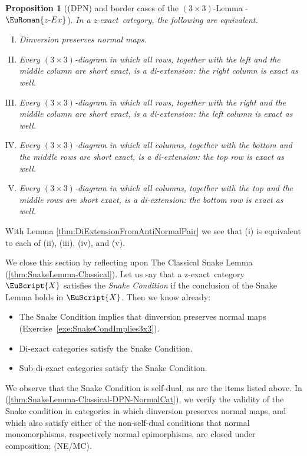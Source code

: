 \documentclass [12pt,oneside]{book}%
\makeatletter
\theoremstyle{captionstyle}  %
\newtheorem{proposition}[theorem]{Proposition}
\renewenvironment{proof}[1][\proofname]{\vspace{-2ex}\par       %
	\pushQED{\qed}%
	\normalfont \topsep6\p@\@plus6\p@\relax
	\trivlist
	\item[\hskip\labelsep
	            \color{proofcaption}\bfseries                %
	            #1\@addpunct{\quad}]\ignorespaces
}{%
	\popQED\endtrivlist\@endpefalse
}
\newenvironment{ulist}{			%
	\begin{itemize}}{
	\end{itemize}
}
\newenvironment{tfae}{		%
	\begin{enumerate}[(I)]}{
	\end{enumerate}
}
\newcommand{\Defn}[1]{\emph{#1}}
\newcommand{\hy}{\text{-}}													%
\newcommand{\Ctgry}[1]{\EuScript{#1}}					%
\newcommand{\ZExact}{z-exact}									%
\newcommand{\Prdct}[2]{#1 \times #2}	 	%
\newcommand{\ZExactTag}{ - {\color{Cerulean} $\EuRoman{z\hy Ex}$}}
\makeatother
\begin{document}
\begin{proposition}[(DPN) and border cases of the $(\Prdct{3}{3})$-Lemma\ZExactTag]
    \label{thm:DPN-PreservationNormalMaps-Border(3x3)}%
    \label{thm:Dinversion-PreservationNormalMaps-Border(3x3)}%
    In a \ZExact\ category, the following are equivalent. %
    \index{$(\Prdct{3}{3})$-Lemma!border cases}%
    \begin{tfae}
        \item Dinversion preserves normal maps.
        \item\label{thm:DPNPNvs3x3-Right3x3}%
        Every $(\Prdct{3}{3})$-diagram in which all rows, together with the left and the middle column are short exact, is a di-extension: the right column is exact as well.
        \item\label{thm:DPNPNvs3x3-Left3x3}%
        Every $(\Prdct{3}{3})$-diagram in which all rows, together with the right and the middle column are short exact, is a di-extension: the left column is exact as well.
        \item\label{thm:DPNPNvs3x3-Top3x3}%
        Every $(\Prdct{3}{3})$-diagram in which all columns, together with  the bottom and the middle rows are short exact, is a di-extension: the top row is exact as well.
        \item\label{thm:DPNPNvs3x3-Bottom3x3}%
        Every $(\Prdct{3}{3})$-diagram in which all columns, together with  the top and the middle rows are short exact, is a di-extension: the bottom row is exact as well.
    \end{tfae}
\end{proposition}
\begin{proof}
    With Lemma \ref{thm:DiExtensionFromAntiNormalPair} we see that (i) is equivalent to each of (ii), (iii), (iv), and (v).
\end{proof}

We close this section by reflecting upon The Classical Snake Lemma (\ref{thm:SnakeLemma-Classical}). Let us say that a \ZExact\ category $\Ctgry{X}$ satisfies the \Defn{Snake Condition} if the conclusion of the Snake Lemma holds in $\Ctgry{X}$. Then we know already:
\begin{ulist}
    \item The Snake Condition implies that dinversion preserves normal maps (Exercise~\ref{exe:SnakeCondImplies3x3}).
    \item Di-exact categories satisfy the Snake Condition.
    \item Sub-di-exact categories satisfy the Snake Condition.
\end{ulist}
We observe that the Snake Condition is self-dual, as are the items listed above. In (\ref{thm:SnakeLemma-Classical-DPN-NormalCat}), we verify the validity of the Snake condition in categories in which dinversion preserves normal maps, and which also satisfy either of the non-self-dual conditions that normal monomorphisms, respectively normal epimorphisms, are closed under composition; (NE/MC).
\end{document}
